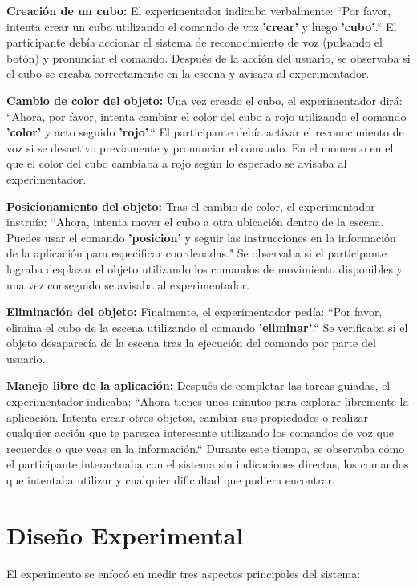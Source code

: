 \documentclass[a4paper, 12pt]{book}
\begin{document}
\textbf{Creación de un cubo:} El experimentador indicaba verbalmente: ``Por favor, intenta crear un cubo utilizando el comando de voz \textbf{'crear'} y luego \textbf{'cubo'}.``
El participante debía accionar el sistema de reconocimiento de voz (pulsando el botón) y pronunciar el comando. Después de la acción del usuario, se observaba si el cubo se creaba correctamente en la escena y avisara al experimentador.

\textbf{Cambio de color del objeto:} Una vez creado el cubo, el experimentador dirá: ``Ahora, por favor, intenta cambiar el color del cubo a rojo utilizando el comando \textbf{'color'} y acto seguido \textbf{'rojo'}.`` 
El participante debía activar el reconocimiento de voz si se desactivo previamente y pronunciar el comando. En el momento en el que el color del cubo cambiaba a rojo según lo esperado se avisaba al experimentador.

\textbf{Posicionamiento del objeto:} Tras el cambio de color, el experimentador instruía: ``Ahora, intenta mover el cubo a otra ubicación dentro de la escena. Puedes usar el comando \textbf{'posicion'} y seguir las instrucciones en la información de la aplicación para especificar coordenadas." Se observaba si el participante lograba desplazar el objeto utilizando los comandos de movimiento disponibles y una vez conseguido se avisaba al experimentador.

\textbf{Eliminación del objeto:} Finalmente, el experimentador pedía: ``Por favor, elimina el cubo de la escena utilizando el comando \textbf{'eliminar'}.`` Se verificaba si el objeto desaparecía de la escena tras la ejecución del comando por parte del usuario.

\textbf{Manejo libre de la aplicación:} Después de completar las tareas guiadas, el experimentador indicaba: ``Ahora tienes unos minutos para explorar libremente la aplicación. Intenta crear otros objetos, cambiar sus propiedades o realizar cualquier acción que te parezca interesante utilizando los comandos de voz que recuerdes o que veas en la información.`` 
Durante este tiempo, se observaba cómo el participante interactuaba con el sistema sin indicaciones directas, los comandos que intentaba utilizar y cualquier dificultad que pudiera encontrar.



\section{Diseño Experimental}
El experimento se enfocó en medir tres aspectos principales del sistema:
\end{document}
